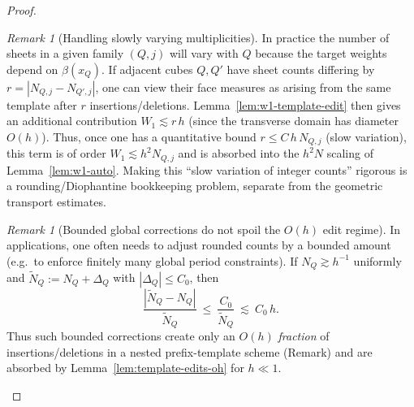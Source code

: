 \documentclass[11pt]{article}
\numberwithin{equation}{section}  %
\theoremstyle{plain}
\theoremstyle{definition}
\theoremstyle{remark}
\newtheorem{remark}[theorem]{Remark}
\begin{document}
\begin{proof}
\begin{remark}[Handling slowly varying multiplicities]\label{rem:w1-multiplicity}
In practice the number of sheets in a given family $(Q,j)$ will vary with $Q$ because the target weights depend on $\beta(x_Q)$.
If adjacent cubes $Q,Q'$ have sheet counts differing by $r=|N_{Q,j}-N_{Q',j}|$, one can view their face measures as arising from the
same template after $r$ insertions/deletions.  Lemma~\ref{lem:w1-template-edit} then gives an additional contribution
$W_1\lesssim r\,h$ (since the transverse domain has diameter $O(h)$).
Thus, once one has a quantitative bound $r\le C\,h\,N_{Q,j}$ (slow variation), this term is of order
$W_1\lesssim h^2 N_{Q,j}$ and is absorbed into the $h^2 N$ scaling of Lemma~\ref{lem:w1-auto}.
Making this ``slow variation of integer counts'' rigorous is a rounding/Diophantine bookkeeping problem, separate from the geometric transport estimates.
\end{remark}














\begin{remark}[Bounded global corrections do not spoil the $O(h)$ edit regime]\label{rem:bounded-corrections}
In applications, one often needs to adjust rounded counts by a bounded amount (e.g.\ to enforce finitely many global period constraints).
If $N_Q\gtrsim h^{-1}$ uniformly and $\widetilde N_Q:=N_Q+\Delta_Q$ with $|\Delta_Q|\le C_0$, then
\[
\frac{|\widetilde N_Q-N_Q|}{\widetilde N_Q}\ \le\ \frac{C_0}{\widetilde N_Q}\ \lesssim\ C_0\,h.
\]
Thus such bounded corrections create only an $O(h)$ \emph{fraction} of insertions/deletions in a nested prefix-template scheme
(Remark) and are absorbed by Lemma~\ref{lem:template-edits-oh} for $h\ll 1$.
\end{remark}


\end{proof}
\end{document}
